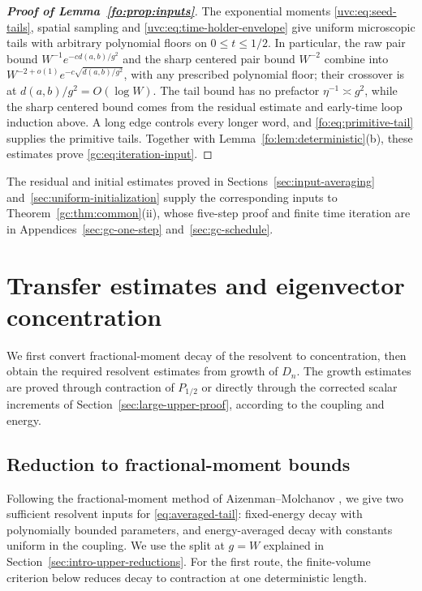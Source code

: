 \documentclass[11pt]{article}
\numberwithin{equation}{section}
\theoremstyle{remark}
\begin{document}
\begin{proof}[\textbf{Proof of Lemma~\ref{fo:prop:inputs}}]
The exponential moments \eqref{uvc:eq:seed-tails}, spatial sampling
and \eqref{uvc:eq:time-holder-envelope} give uniform microscopic tails
with arbitrary polynomial floors on $0\le t\le1/2$. In particular,
the raw pair bound $W^{-1}e^{-c d(a,b)/g^2}$ and the sharp
centered pair bound $W^{-2}$ combine into
$W^{-2+o(1)}e^{-c\sqrt{d(a,b)/g^2}}$, with any prescribed
polynomial floor; their crossover is at $d(a,b)/g^2=O(\log W)$.
The tail bound has no prefactor
$\eta^{-1}\asymp g^2$, while the sharp centered bound comes
from the residual estimate and early-time loop induction above.
A long edge controls every longer word, and
\eqref{fo:eq:primitive-tail} supplies the primitive tails.
Together with Lemma~\ref{fo:lem:deterministic}(b), these estimates prove
\eqref{gc:eq:iteration-input}.
\end{proof}

The residual and initial estimates proved in
Sections~\ref{sec:input-averaging} and~\ref{sec:uniform-initialization}
supply the corresponding inputs to Theorem~\ref{gc:thm:common}(ii),
whose five-step proof and
finite time iteration are in Appendices~\ref{sec:gc-one-step}
and~\ref{sec:gc-schedule}.

\section{Transfer estimates and eigenvector concentration}
\label{sec:upper-method}

We first convert fractional-moment decay of the resolvent to
concentration, then obtain the required resolvent estimates from growth
of $D_n$. The growth estimates are proved through contraction of
$P_{1/2}$ or directly through the corrected scalar increments of
Section~\ref{sec:large-upper-proof}, according to the coupling and energy.

\subsection{Reduction to fractional-moment bounds}
\label{sec:fr-concentration}

Following the fractional-moment method of Aizenman--Molchanov
\cite{AM}, we give two sufficient resolvent inputs for
\eqref{eq:averaged-tail}: fixed-energy decay with polynomially bounded
parameters, and energy-averaged decay with constants uniform in the
coupling. We use the split at $g=W$ explained in
Section~\ref{sec:intro-upper-reductions}.
For the first route, the finite-volume criterion below reduces decay
to contraction at one deterministic length.
\end{document}
